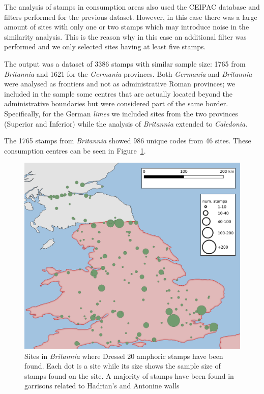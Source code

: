 The analysis of stamps in consumption areas also used the CEIPAC database and filters performed for the previous dataset. However, in this case there was a large amount of sites with only one or two stamps which may introduce noise in the similarity analysis. This is the reason why in this case an additional filter was performed and we only selected sites having at least five stamps.

The output was a dataset of 3386 stamps with similar sample size: 1765 from \textit{Britannia} and 1621 for the \textit{Germania} provinces. Both \textit{Germania} and \textit{Britannia} were analysed as frontiers and not as administrative Roman provinces; we included in the sample some centres that are actually located beyond the administrative boundaries but were considered part of the same border. Specifically, for the German \textit{limes} we included sites from the two provinces (Superior and Inferior) while the analysis of \textit{Britannia} extended to \textit{Caledonia}.
 
The 1765 stamps from \textit{Britannia} showed 986 unique codes from 46 sites. These consumption centres can be seen in Figure~\ref{britannia}.
 
\begin{figure}[htp]
	\centering
\includegraphics[width=\linewidth]{britannia}
\caption{Sites in \textit{Britannia} where Dressel 20 amphoric stamps have been found. Each dot is a site while its size shows the sample size of stamps found on the site. A majority of stamps have been found in garrisons related to Hadrian's and Antonine walls}
\label{britannia}
\end{figure} 

